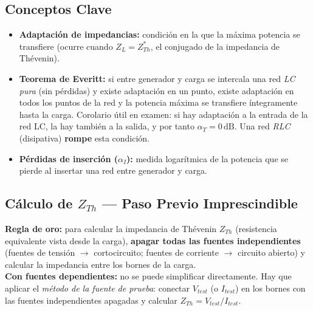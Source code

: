 \documentclass[12pt,a4paper]{article}
\begin{document}
\subsection{Conceptos Clave}

\begin{itemize}[leftmargin=1.5em, itemsep=4pt]
  \item \textbf{Adaptación de impedancias:} condición en la que la máxima potencia se transfiere (ocurre cuando $Z_L = Z_{Th}^*$, el conjugado de la impedancia de Thévenin).

  \item \textbf{Teorema de Everitt:} si entre generador y carga se intercala una red
        \emph{LC pura} (sin pérdidas) y existe adaptación en un punto, existe adaptación
        en todos los puntos de la red y la potencia máxima se transfiere íntegramente
        hasta la carga. Corolario útil en examen: si hay adaptación a la entrada de
        la red LC, la hay también a la salida, y por tanto $\alpha_T = 0\,\text{dB}$.
        Una red \emph{RLC} (disipativa) \textbf{rompe} esta condición.

  \item \textbf{Pérdidas de inserción ($\alpha_I$):} medida logarítmica de la potencia
        que se pierde al insertar una red entre generador y carga.
\end{itemize}

\subsection{Cálculo de $Z_{Th}$ — Paso Previo Imprescindible}

\begin{warnbox}
\textbf{\color{warnorangeline}Regla de oro:} para calcular la impedancia de Thévenin $Z_{Th}$ (resistencia equivalente vista desde la carga), \textbf{apagar todas las fuentes independientes}
(fuentes de tensión $\to$ cortocircuito; fuentes de corriente $\to$ circuito abierto)
y calcular la impedancia entre los bornes de la carga.\\[4pt]
\textbf{Con fuentes dependientes:} no se puede simplificar directamente. Hay que aplicar
el \emph{método de la fuente de prueba}: conectar $V_{test}$ (o $I_{test}$) en los
bornes con las fuentes independientes apagadas y calcular
$Z_{Th} = V_{test}/I_{test}$.
\end{warnbox}
\clearpage %
\end{document}
